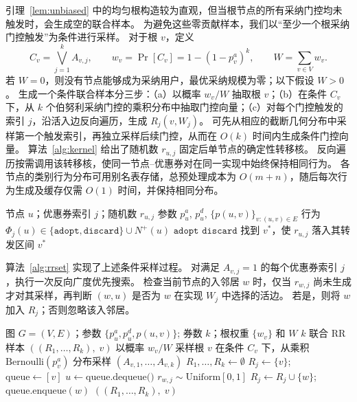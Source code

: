 \documentclass[sigconf,balance=false]{acmart}
\begin{document}
引理~\ref{lem:unbiased} 中的均匀根构造较为直观，但当根节点的所有采纳门控均未触发时，会生成空的联合样本。
为避免这些零贡献样本，我们以“至少一个根采纳门控触发”为条件进行采样。
对于根 $v$，定义
\[
  C_v=\bigvee_{j=1}^k A_{v,j},\qquad
  w_v=\Pr[C_v]=1-(1-p_v^a)^k,\qquad
  W=\sum_{v\in V}w_v.
\]
若 $W=0$，则没有节点能够成为采纳用户，最优采纳规模为零；以下假设 $W>0$。
生成一个条件联合样本分三步：（a）以概率 $w_v/W$ 抽取根 $v$；（b）在条件 $C_v$ 下，从 $k$ 个伯努利采纳门控的乘积分布中抽取门控向量；（c）对每个门控触发的索引 $j$，沿活入边反向遍历，生成 $R_j(v,W_j)$。
可先从相应的截断几何分布中采样第一个触发索引，再独立采样后续门控，从而在 $O(k)$ 时间内生成条件门控向量。
算法~\ref{alg:kernel} 给出了随机数 $r_{u,j}$ 固定后单节点的确定性转移核。
反向遍历按需调用该转移核，使同一节点--优惠券对在同一实现中始终保持相同行为。
各节点的类别行为分布可用别名表存储，总预处理成本为 $O(m+n)$，随后每次行为生成及缓存仅需 $O(1)$ 时间，并保持相同分布。

\begin{algorithm}[t]
\caption{单节点转移核}
\label{alg:kernel}
\begin{algorithmic}[1]
\Require 节点 $u$；优惠券索引 $j$；随机数 $r_{u,j}$
\Require 参数 $p_u^a$, $p_u^d$,
  $\{p(u,v)\}_{v:(u,v)\in E}$
\Ensure 行为
  $\Phi_j(u)\in\{\mathtt{adopt},\mathtt{discard}\}\cup N^+(u)$
  \State \Return $\mathtt{adopt}$
  \State \Return $\mathtt{discard}$
\Else
  \State 找到 $v^*$，使 $r_{u,j}$ 落入其转发区间
  \State \Return $v^*$
\EndIf
\end{algorithmic}
\end{algorithm}

算法~\ref{alg:rrset} 实现了上述条件采样过程。
对满足 $A_{v,j}=1$ 的每个优惠券索引 $j$，执行一次反向广度优先搜索。
检查当前节点的入邻居 $w$ 时，仅当 $r_{w,j}$ 尚未生成才对其采样，再判断 $(w,u)$ 是否为 $w$ 在实现 $W_j$ 中选择的活边。
若是，则将 $w$ 加入 $R_j$；否则忽略该入邻居。

\begin{algorithm}[t]
\caption{条件 $k$ 联合 RR 样本生成}
\label{alg:rrset}
\begin{algorithmic}[1]
\Require 图 $G=(V,E)$；参数 $\{p_u^a, p_u^d, p(u,v)\}$;
  券数 $k$；根权重 $\{w_v\}$ 和 $W$
\Ensure $k$ 联合 RR 样本 $((R_1,\ldots,R_k),\; v)$
\State 以概率 $w_v/W$ 采样根 $v$
\State 在条件 $C_v$ 下，从乘积
  $\mathrm{Bernoulli}(p_v^a)$ 分布采样 $(A_{v,1},\ldots,A_{v,k})$
\State $R_1, \ldots, R_k \gets \emptyset$
    \State $R_j \gets \{v\}$;\ \ $\text{queue} \gets [v]$
      \State $u \gets \text{queue.dequeue()}$
            \State $r_{w,j} \sim \mathrm{Uniform}[0,1]$
          \EndIf
            \State $R_j \gets R_j \cup \{w\}$;\ \
              $\text{queue.enqueue}(w)$
          \EndIf
        \EndIf
      \EndFor
    \EndWhile
  \EndIf
\EndFor
\State \Return $((R_1, \ldots, R_k),\; v)$
\end{algorithmic}
\end{algorithm}
\end{document}

